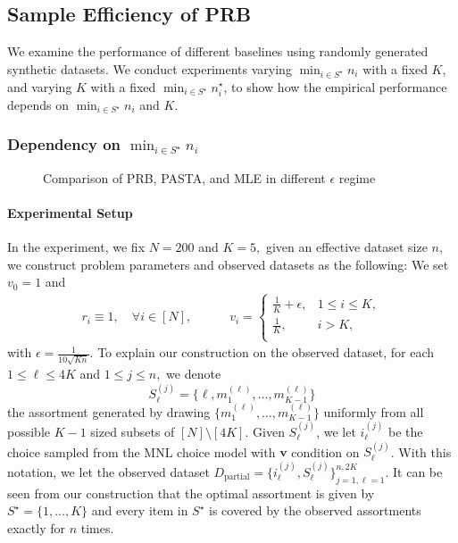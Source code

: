 \documentclass[10pt, letterpaper]{article}
\begin{document}
\subsection{Sample Efficiency of PRB}

We examine the performance of different baselines using randomly generated synthetic datasets. We conduct experiments varying $\min_{i \in S^\star} n_i$ with a fixed $K$, and varying $K$ with a fixed $\min_{i \in S^\star} n_i^\star$, to show how the empirical performance depends on $\min_{i \in S^\star} n_i$ and $K$.

\subsubsection{Dependency on  $\min_{i\in S^\star}n_i$}\label{sec-experiment-partial-coverage}

\begin{figure}[htbp]
    \centering
    \hfill  %
    \caption{Comparison of PRB, PASTA, and MLE in different $\epsilon$ regime}
    \label{fig:dependency-on-n}
\end{figure}


\paragraph{Experimental Setup} In the experiment, we fix $N = 200$ and $K = 5,$ given an effective dataset size $n$, we construct problem parameters and observed datasets as the following: We set $v_0 = 1$ and \begin{align*}
  r_i \equiv 1, \quad \forall i\in[N],  \qquad  \quad  v_i = \begin{cases}
        \frac{1}{K}+ \epsilon, & 1\leq i\leq K,\\
        \frac{1}{K}, & i>K,\\
    \end{cases}
\end{align*}
with $\epsilon=\frac{1}{10\sqrt{Kn}}$. To explain our construction on the observed dataset, for each $1\leq \ell \leq 4K$ and $1\leq j\leq n,$ we denote $$S_{\ell}^{(j)} = \{\ell, m_{1}^{(\ell)},\dots,m_{K-1}^{(\ell)}\}$$
the assortment generated by drawing $\{m_1^{(\ell)},\dots, m_{K-1}^{(\ell)}\}$ uniformly from all possible $K-1$ sized subsets of $[N]\setminus [4K].$ Given $S_{\ell}^{(j)}$, we let  $i_{\ell}^{(j)}$ be the choice sampled from the MNL choice model with $\bm v$ condition on $S_{\ell}^{(j)}$. With this notation, we let the observed dataset $D_{\text{partial}} = \{i_\ell^{(j)},S_{\ell}^{(j)}\}_{j = 1,\ell = 1}^{n,2K}$. It can be seen from our construction that the optimal assortment is given by $S^\star = \{1,\dots,K\}$ and every item in $S^\star$ is covered by the observed assortments exactly for $n$ times. 
\end{document}
